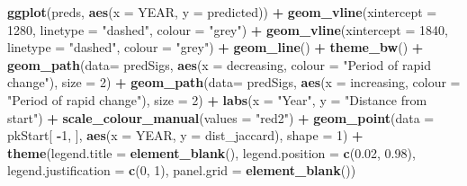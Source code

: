 \documentclass[nofonts,]{tufte-handout}
\newenvironment{Shaded}{\begin{snugshade}}{\end{snugshade}}
\newcommand{\AttributeTok}[1]{\textcolor[rgb]{0.13,0.29,0.53}{#1}}
\newcommand{\DecValTok}[1]{\textcolor[rgb]{0.00,0.00,0.81}{#1}}
\newcommand{\FloatTok}[1]{\textcolor[rgb]{0.00,0.00,0.81}{#1}}
\newcommand{\FunctionTok}[1]{\textcolor[rgb]{0.13,0.29,0.53}{\textbf{#1}}}
\newcommand{\NormalTok}[1]{#1}
\newcommand{\SpecialCharTok}[1]{\textcolor[rgb]{0.81,0.36,0.00}{\textbf{#1}}}
\newcommand{\StringTok}[1]{\textcolor[rgb]{0.31,0.60,0.02}{#1}}
\begin{document}
\begin{Shaded}
\begin{Highlighting}[]
\FunctionTok{ggplot}\NormalTok{(preds, }\FunctionTok{aes}\NormalTok{(}\AttributeTok{x =}\NormalTok{ YEAR, }\AttributeTok{y =}\NormalTok{ predicted)) }\SpecialCharTok{+}
  \FunctionTok{geom\_vline}\NormalTok{(}\AttributeTok{xintercept =} \DecValTok{1280}\NormalTok{, }\AttributeTok{linetype =} \StringTok{"dashed"}\NormalTok{,}
             \AttributeTok{colour =} \StringTok{"grey"}\NormalTok{) }\SpecialCharTok{+}
  \FunctionTok{geom\_vline}\NormalTok{(}\AttributeTok{xintercept =} \DecValTok{1840}\NormalTok{, }\AttributeTok{linetype =} \StringTok{"dashed"}\NormalTok{,}
             \AttributeTok{colour =} \StringTok{"grey"}\NormalTok{) }\SpecialCharTok{+}
  \FunctionTok{geom\_line}\NormalTok{() }\SpecialCharTok{+}
  \FunctionTok{theme\_bw}\NormalTok{() }\SpecialCharTok{+}
  \FunctionTok{geom\_path}\NormalTok{(}\AttributeTok{data=}\NormalTok{ predSigs,}
            \FunctionTok{aes}\NormalTok{(}\AttributeTok{x =}\NormalTok{ decreasing,}
                \AttributeTok{colour =} \StringTok{"Period of rapid change"}\NormalTok{),}
            \AttributeTok{size =} \DecValTok{2}\NormalTok{) }\SpecialCharTok{+}
  \FunctionTok{geom\_path}\NormalTok{(}\AttributeTok{data=}\NormalTok{ predSigs,}
            \FunctionTok{aes}\NormalTok{(}\AttributeTok{x =}\NormalTok{ increasing,}
                \AttributeTok{colour =} \StringTok{"Period of rapid change"}\NormalTok{),}
            \AttributeTok{size =} \DecValTok{2}\NormalTok{) }\SpecialCharTok{+}
  \FunctionTok{labs}\NormalTok{(}\AttributeTok{x =} \StringTok{"Year"}\NormalTok{, }\AttributeTok{y =} \StringTok{"Distance from start"}\NormalTok{) }\SpecialCharTok{+}
  \FunctionTok{scale\_colour\_manual}\NormalTok{(}\AttributeTok{values =} \StringTok{"red2"}\NormalTok{) }\SpecialCharTok{+}
  \FunctionTok{geom\_point}\NormalTok{(}\AttributeTok{data =}\NormalTok{ pkStart[ }\SpecialCharTok{{-}}\DecValTok{1}\NormalTok{, ], }
             \FunctionTok{aes}\NormalTok{(}\AttributeTok{x =}\NormalTok{ YEAR, }\AttributeTok{y =}\NormalTok{ dist\_jaccard),}
             \AttributeTok{shape =} \DecValTok{1}\NormalTok{) }\SpecialCharTok{+}
  \FunctionTok{theme}\NormalTok{(}\AttributeTok{legend.title =} \FunctionTok{element\_blank}\NormalTok{(),}
        \AttributeTok{legend.position =} \FunctionTok{c}\NormalTok{(}\FloatTok{0.02}\NormalTok{, }\FloatTok{0.98}\NormalTok{),}
        \AttributeTok{legend.justification =} \FunctionTok{c}\NormalTok{(}\DecValTok{0}\NormalTok{, }\DecValTok{1}\NormalTok{),}
        \AttributeTok{panel.grid =} \FunctionTok{element\_blank}\NormalTok{())}
\end{Highlighting}
\end{Shaded}
\end{document}
